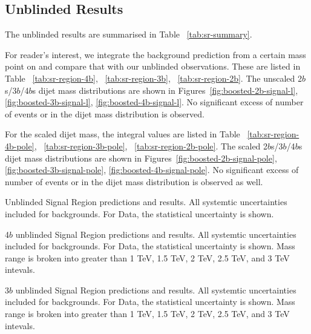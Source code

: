 \subsection{Unblinded Results}
The unblinded results are summarised in Table ~\ref{tab:sr-summary}. 

For reader's interest, we integrate the background prediction from a certain mass point on and compare that with our unblinded observations. These are listed in Table ~\ref{tab:sr-region-4b}, ~\ref{tab:sr-region-3b}, ~\ref{tab:sr-region-2b}. The unscaled 2$b$s/3$b$/4$b$s dijet mass distributions are shown in Figures~\ref{fig:boosted-2b-signal-l}, \ref{fig:boosted-3b-signal-l}, \ref{fig:boosted-4b-signal-l}. No significant excess of number of events or in the dijet mass distribution is observed.

For the scaled dijet mass, the integral values are listed in Table ~\ref{tab:sr-region-4b-pole}, ~\ref{tab:sr-region-3b-pole}, ~\ref{tab:sr-region-2b-pole}. The scaled 2$b$s/3$b$/4$b$s dijet mass distributions are shown in Figures~\ref{fig:boosted-2b-signal-pole}, \ref{fig:boosted-3b-signal-pole}, \ref{fig:boosted-4b-signal-pole}. No significant excess of number of events or in the dijet mass distribution is observed as well.


\begin{table}[htbp!]
\scriptsize
\begin{center}
%
\caption{Unblinded Signal Region predictions and results. All systemtic uncertainties included for backgrounds. For Data, the statistical uncertainty is shown.}
\label{tab:sr-summary}
\end{center}
\end{table}

\begin{table}[htbp!]
\scriptsize
\begin{center}
%
\caption{4$b$ unblinded Signal Region predictions and results. All systemtic uncertainties included for backgrounds. For Data, the statistical uncertainty is shown. Mass range is broken into greater than 1 TeV, 1.5 TeV, 2 TeV, 2.5 TeV, and 3 TeV intevals.}
\label{tab:sr-region-4b}
\end{center}
\end{table}

\begin{table}[htbp!]
\scriptsize
\begin{center}
%
\caption{3$b$ unblinded Signal Region predictions and results. All systemtic uncertainties included for backgrounds. For Data, the statistical uncertainty is shown. Mass range is broken into greater than 1 TeV, 1.5 TeV, 2 TeV, 2.5 TeV, and 3 TeV intevals.}
\label{tab:sr-region-3b}
\end{center}
\end{table}

